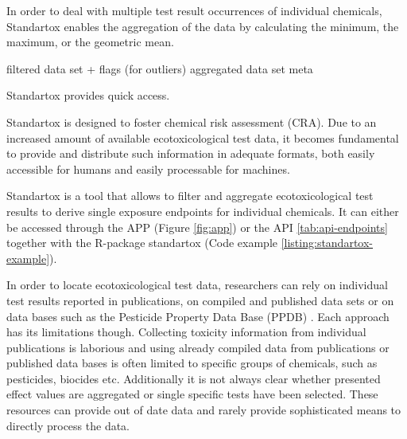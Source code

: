 In order to deal with multiple test result occurrences of individual chemicals, Standartox enables the aggregation of the data by calculating the minimum, the maximum, or the geometric mean.

filtered data set + flags (for outliers)
aggregated data set
meta



Standartox provides quick access.

Standartox is designed to foster chemical risk assessment (CRA). Due to an increased amount of available ecotoxicological test data, it becomes fundamental to provide and distribute such information in adequate formats, both easily accessible for humans and easily processable for machines. 







Standartox is a tool that allows to filter and aggregate ecotoxicological test results to derive single exposure endpoints for individual chemicals. It can either be accessed through the APP (Figure \ref{fig:app}) or the API \ref{tab:api-endpoints} together with the R-package standartox (Code example \ref{listing:standartox-example}). 











\pagebreak


\pagebreak


\pagebreak




In order to locate ecotoxicological test data, researchers can rely on individual test results reported in publications, on compiled and published data sets \citep{malaj_organic_2014, morrissey_neonicotinoid_2015} or on data bases such as the Pesticide Property Data Base (PPDB) \citep{lewis_international_2016}. Each approach has its limitations though. Collecting toxicity information from individual publications is laborious and using already compiled data from publications or published data bases is often limited to specific groups of chemicals, such as pesticides, biocides etc. Additionally it is not always clear whether presented effect values are aggregated or single specific tests have been selected. These resources can provide out of date data and rarely provide sophisticated means to directly process the data.



